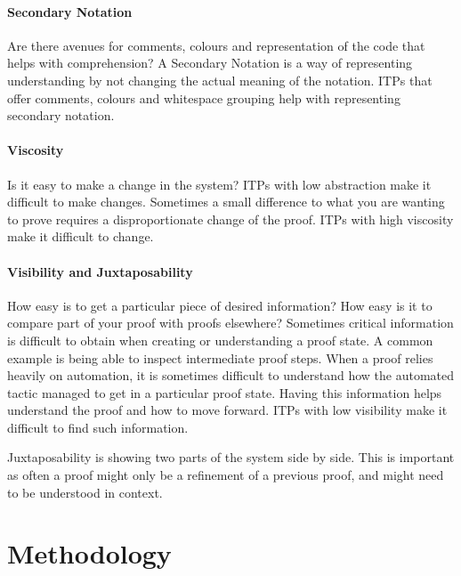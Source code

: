 \documentclass[
]{article}
\begin{document}
\hypertarget{secondary-notation}{%
\paragraph{Secondary Notation}\label{secondary-notation}}

Are there avenues for comments, colours and representation of the code
that helps with comprehension? A Secondary Notation is a way of
representing understanding by not changing the actual meaning of the
notation. ITPs that offer comments, colours and whitespace grouping help
with representing secondary notation.

\hypertarget{viscosity}{%
\paragraph{Viscosity}\label{viscosity}}

Is it easy to make a change in the system? ITPs with low abstraction
make it difficult to make changes. Sometimes a small difference to what
you are wanting to prove requires a disproportionate change of the
proof. ITPs with high viscosity make it difficult to change.

\hypertarget{visibility-and-juxtaposability}{%
\paragraph{Visibility and
Juxtaposability}\label{visibility-and-juxtaposability}}

How easy is to get a particular piece of desired information? How easy
is it to compare part of your proof with proofs elsewhere? Sometimes
critical information is difficult to obtain when creating or
understanding a proof state. A common example is being able to inspect
intermediate proof steps. When a proof relies heavily on automation, it
is sometimes difficult to understand how the automated tactic managed to
get in a particular proof state. Having this information helps
understand the proof and how to move forward. ITPs with low visibility
make it difficult to find such information.

Juxtaposability is showing two parts of the system side by side. This is
important as often a proof might only be a refinement of a previous
proof, and might need to be understood in context.

\hypertarget{methodology}{%
\section{Methodology}\label{methodology}}
\end{document}
